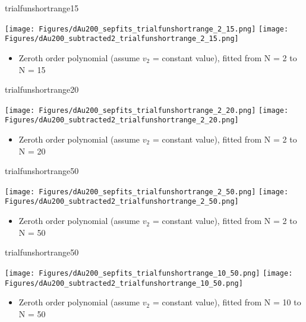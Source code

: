 \documentclass[aspectratio=169,compress,10pt]{beamer}
\begin{document}
\begin{frame}{trialfunshortrange15}
\begin{center}
\texttt{[image: Figures/dAu200\_sepfits\_trialfunshortrange\_2\_15.png]}
\texttt{[image: Figures/dAu200\_subtracted2\_trialfunshortrange\_2\_15.png]}
\end{center}
\begin{itemize}
\item Zeroth order polynomial (assume $v_2$ = constant value), fitted from N = 2 to N = 15
\end{itemize}
\end{frame}



\begin{frame}{trialfunshortrange20}
\begin{center}
\texttt{[image: Figures/dAu200\_sepfits\_trialfunshortrange\_2\_20.png]}
\texttt{[image: Figures/dAu200\_subtracted2\_trialfunshortrange\_2\_20.png]}
\end{center}
\begin{itemize}
\item Zeroth order polynomial (assume $v_2$ = constant value), fitted from N = 2 to N = 20
\end{itemize}
\end{frame}



\begin{frame}{trialfunshortrange50}
\begin{center}
\texttt{[image: Figures/dAu200\_sepfits\_trialfunshortrange\_2\_50.png]}
\texttt{[image: Figures/dAu200\_subtracted2\_trialfunshortrange\_2\_50.png]}
\end{center}
\begin{itemize}
\item Zeroth order polynomial (assume $v_2$ = constant value), fitted from N = 2 to N = 50
\end{itemize}
\end{frame}



\begin{frame}{trialfunshortrange50}
\begin{center}
\texttt{[image: Figures/dAu200\_sepfits\_trialfunshortrange\_10\_50.png]}
\texttt{[image: Figures/dAu200\_subtracted2\_trialfunshortrange\_10\_50.png]}
\end{center}
\begin{itemize}
\item Zeroth order polynomial (assume $v_2$ = constant value), fitted from N = 10 to N = 50
\end{itemize}
\end{frame}
\end{document}

